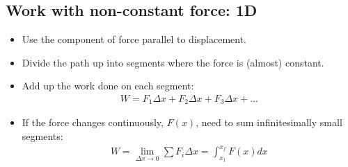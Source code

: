 \documentclass[aspectratio=169,
hyperref={colorlinks,urlcolor=blue}
]{beamer}
\begin{document}


\subsection{Work with non-constant force: 1D}
\label{subsec:workwithnonconstantforce1d}
{
\begin{itemize}
\item Use the component of force parallel to displacement.
\item Divide the path up into segments where the force is (almost) constant.
\item Add up the work done on each segment:
\begin{align*}
W=F_1\Delta x+ F_2\Delta x+ F_3\Delta x+\dots
\end{align*}
\item<2-> If the force changes continuously, $F(x)$, need to sum infinitesimally small segments:
\begin{align*}
W=\lim_{\Delta x \to 0}\sum F_i\Delta x=\int_{x_1}^{x_f}F(x) dx
\end{align*}
\end{itemize}

}
\end{document}
